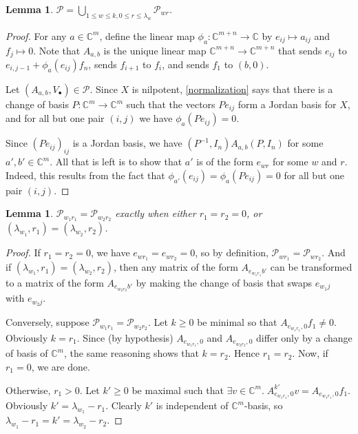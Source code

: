 \documentclass[12pt,psamsfonts]{article}
\newtheorem{lemma}[theorem]{Lemma}
\begin{document}
\begin{lemma}\label{pwr_union}
    \(\mathcal{P} = \bigcup_{1 \leq w \leq k, 0 \leq r \leq \lambda_{w}} \mathcal{P}_{wr}\).
\end{lemma}
\begin{proof}
    For any \(a \in \mathbb{C}^m\), define the linear map \(\phi_a : \mathbb{C}^{m + n} \to \mathbb{C}\) by \(e_{ij} \mapsto a_{ij}\) and \(f_j \mapsto 0\).
    Note that \(A_{a,b}\) is the unique linear map \(\mathbb{C}^{m + n} \to \mathbb{C}^{m + n}\) that sends \(e_{ij}\) to \(e_{i,j-1} + \phi_a(e_{ij}) f_n\), sends \(f_{i + 1}\) to \(f_i\), and sends \(f_1\) to \((b, 0)\).
    \par Let \((A_{a, b}, V_\bullet) \in \mathcal{P}\).
    Since \(X\) is nilpotent, \cref{normalization} says that there is a change of basis \(P : \mathbb{C}^m \to \mathbb{C}^m\) such that the vectors \(Pe_{ij}\) form a Jordan basis for \(X\), and for all but one pair \((i, j)\) we have \(\phi_a(Pe_{ij}) = 0\).
    \par Since \((Pe_{ij})_{ij}\) is a Jordan basis, we have \((P^{-1}, I_n) A_{a,b}(P, I_n)\) for some \(a',b' \in \mathbb{C}^m\).
    All that is left is to show that \(a'\) is of the form \(e_{wr}\) for some \(w\) and \(r\).
    Indeed, this results from the fact that \(\phi_{a'}(e_{ij}) = \phi_a(Pe_{ij}) = 0\) for all but one pair \((i,j)\).
\end{proof}
\begin{lemma}
    \(\mathcal{P}_{w_1r_1} = \mathcal{P}_{w_2r_2}\) exactly when either \(r_1 = r_2 = 0\), or \((\lambda_{w_1}, r_1) = (\lambda_{w_2}, r_2)\).
\end{lemma}
\begin{proof}
    If \(r_1 = r_2 = 0\), we have \(e_{wr_1} = e_{wr_2} = 0\), so by definition, \(\mathcal{P}_{wr_1} = \mathcal{P}_{wr_2}\).
    And if \((\lambda_{w_1}, r_1) = (\lambda_{w_2}, r_2)\), then any matrix of the form \(A_{e_{w_1r_1}b'}\) can be transformed to a matrix of the form \(A_{e_{w_2r_2}b'}\) by making the change of basis that swaps \(e_{w_1j}\) with \(e_{w_2j}\).
    \par Conversely, suppose \(\mathcal{P}_{w_1r_1} = \mathcal{P}_{w_2r_2}\).
    Let \(k \geq 0\) be minimal so that \(A_{e_{w_1r_1},0} f_1 \neq 0\).
    Obviously \(k = r_1\).
    Since (by hypothesis) \(A_{e_{w_1r_1},0}\) and \(A_{e_{w_2r_2},0}\) differ only by a change of basis of \(\mathbb{C}^m\), the same reasoning shows that \(k = r_2\).
    Hence \(r_1 = r_2\).
    Now, if \(r_1 = 0\), we are done.
    \par Otherwise, \(r_1 > 0\).
    Let \(k' \geq 0\) be maximal such that \(\exists v \in \mathbb{C}^m. \; A_{e_{w_1r_1},0}^{k'} v = A_{e_{w_1r_1},0} f_1\).
    Obviously \(k' = \lambda_{w_1} - r_1\).
    Clearly \(k'\) is independent of \(\mathbb{C}^m\)-basis, so \(\lambda_{w_1} - r_1 = k' = \lambda_{w_2} - r_2\).
\end{proof}
\end{document}
